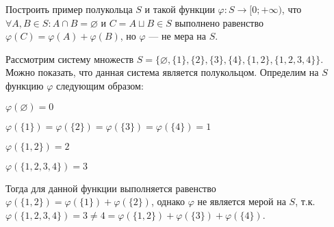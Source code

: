  \begin{task}{1}
Построить пример полукольца $S$ и такой функции $\varphi : S \to [0; +\infty)$, что $\forall A, B \in S: A \cap B  = \varnothing \text{ и } C = A \sqcup B \in S$
выполнено равенство  $\varphi(C) = \varphi(A) + \varphi(B)$, но $\varphi$ --- не мера на $S$.
\end{task}
\begin{solution}
Рассмотрим систему множеств $S = \{\varnothing, \{1\}, \{2\}, \{3\}, \{4\}, \{1, 2\}, \{1, 2, 3, 4\} \}$. Можно показать, что данная система является полукольцом. Определим на $S$ функцию $\varphi$ следующим образом:

$\varphi(\varnothing) = 0$

$\varphi(\{1\}) = \varphi(\{2\}) = \varphi(\{3\}) = \varphi(\{4\}) = 1$

$\varphi(\{1, 2\}) = 2$

$\varphi(\{1, 2, 3, 4\}) = 3$

Тогда для данной функции выполняется равенство $\varphi(\{1, 2\}) = \varphi(\{1\}) + \varphi(\{2\})$, однако $\varphi$ не является мерой на $S$, т.к. $\varphi(\{1, 2, 3, 4\}) = 3 \neq 4 = \varphi(\{1, 2\}) + \varphi(\{3\}) + \varphi(\{4\})$.
\end{solution}